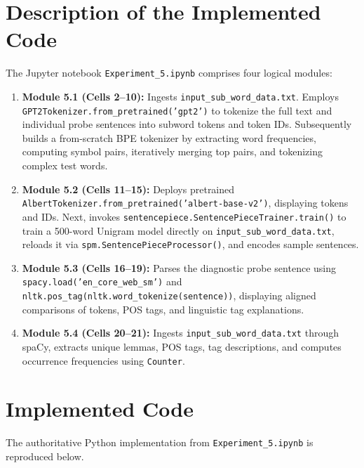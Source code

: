 \section{Description of the Implemented Code}
The Jupyter notebook \texttt{Experiment\_5.ipynb} comprises four logical modules:
\begin{enumerate}
    \item \textbf{Module 5.1 (Cells 2--10):} Ingests \texttt{input\_sub\_word\_data.txt}. Employs \texttt{GPT2Tokenizer.from\_pretrained('gpt2')} to tokenize the full text and individual probe sentences into subword tokens and token IDs. Subsequently builds a from-scratch BPE tokenizer by extracting word frequencies, computing symbol pairs, iteratively merging top pairs, and tokenizing complex test words.
    \item \textbf{Module 5.2 (Cells 11--15):} Deploys pretrained \texttt{AlbertTokenizer.from\_pretrained('albert-base-v2')}, displaying tokens and IDs. Next, invokes \texttt{sentencepiece.SentencePieceTrainer.train()} to train a 500-word Unigram model directly on \texttt{input\_sub\_word\_data.txt}, reloads it via \texttt{spm.SentencePieceProcessor()}, and encodes sample sentences.
    \item \textbf{Module 5.3 (Cells 16--19):} Parses the diagnostic probe sentence using \texttt{spacy.load('en\_core\_web\_sm')} and \texttt{nltk.pos\_tag(nltk.word\_tokenize(sentence))}, displaying aligned comparisons of tokens, POS tags, and linguistic tag explanations.
    \item \textbf{Module 5.4 (Cells 20--21):} Ingests \texttt{input\_sub\_word\_data.txt} through spaCy, extracts unique lemmas, POS tags, tag descriptions, and computes occurrence frequencies using \texttt{Counter}.
\end{enumerate}

\section{Implemented Code}
The authoritative Python implementation from \texttt{Experiment\_5.ipynb} is reproduced below.

